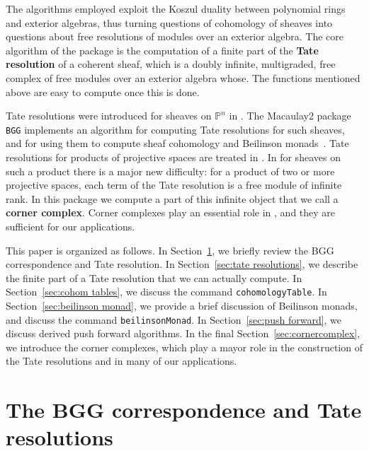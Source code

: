 \documentclass[twoside,12pt, leqno]{amsart}
\def\PP{{\mathbb P}}
\begin{document}
The algorithms employed exploit the Koszul duality between polynomial rings and exterior algebras, thus turning questions of cohomology of sheaves into questions about free resolutions of modules over an exterior algebra.  The core algorithm of the package is the computation of a finite part of the {\bf Tate resolution} of a coherent sheaf, which is a doubly infinite, multigraded, free complex of free modules over an exterior algebra whose.  The functions mentioned above are easy to compute once this is done.

Tate resolutions were introduced for sheaves on $\PP^n$ in \cite{EFS}.  The Macaulay2 package {\tt BGG} implements an algorithm for computing Tate resolutions for such sheaves, and for using them to compute sheaf cohomology and Beilinson monads~\cite{M2BGG}.  Tate resolutions for products of projective spaces are treated in \cite{EES}.  In for sheaves on such a product there is a major new difficulty: for a product of two or more projective spaces, each term of the Tate resolution is a free module of infinite rank.  In this package we compute  a part of this infinite object that we call a {\bf corner complex}.  Corner complexes play an essential role in \cite{EES}, and they are sufficient for our applications.

This paper is organized as follows.  In Section~\ref{sec:background}, we briefly review the BGG correspondence and Tate resolution.  In Section~\ref{sec:tate resolutions}, we describe the finite part of a Tate resolution that we can actually compute.  In Section~\ref{sec:cohom tables}, we discuss the command {\tt cohomologyTable}.  
In Section~\ref{sec:beilinson monad}, we provide a brief discussion of Beilinson monads, and discuss the command {\tt beilinsonMonad}.  In Section~\ref{sec:push forward}, we discuss derived push forward algorithms. In the final Section~\ref{sec:cornercomplex}, we introduce the corner complexes, which play a mayor role in the construction of the Tate resolutions and in many of our applications.
 
%

\section{The BGG correspondence and Tate resolutions}\label{sec:background}
\end{document}
